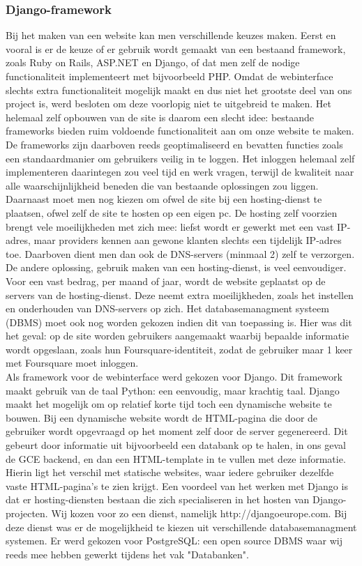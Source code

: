 \subsubsection{Django-framework}
Bij het maken van een website kan men verschillende keuzes maken.
Eerst en vooral is er de keuze of er gebruik wordt gemaakt van een bestaand framework, zoals Ruby on Rails, ASP.NET en Django, of dat men zelf de nodige functionaliteit implementeert met bijvoorbeeld PHP.
Omdat de webinterface slechts extra functionaliteit mogelijk maakt en dus niet het grootste deel van ons project is, werd besloten om deze voorlopig niet te uitgebreid te maken.
Het helemaal zelf opbouwen van de site is daarom een slecht idee: bestaande frameworks bieden ruim voldoende functionaliteit aan om onze website te maken. De frameworks zijn daarboven reeds geoptimaliseerd en bevatten functies zoals een standaardmanier om gebruikers veilig in te loggen. Het inloggen helemaal zelf implementeren daarintegen zou veel tijd en werk vragen, terwijl de kwaliteit naar alle waarschijnlijkheid beneden die van bestaande oplossingen zou liggen. 
Daarnaast moet men nog kiezen om ofwel de site bij een hosting-dienst te plaatsen, ofwel zelf de site te hosten op een eigen pc. De hosting zelf voorzien brengt vele moeilijkheden met zich mee: liefst wordt er gewerkt met een vast IP-adres, maar providers kennen aan gewone klanten slechts een tijdelijk IP-adres toe. Daarboven dient men dan ook de DNS-servers (minmaal 2) zelf te verzorgen.
De andere oplossing, gebruik maken van een hosting-dienst, is veel eenvoudiger. Voor een vast bedrag, per maand of jaar, wordt de website geplaatst op de servers van de hosting-dienst. Deze neemt extra moeilijkheden, zoals het instellen en onderhouden van DNS-servers op zich.
Het databasemanagment systeem (DBMS) moet ook nog worden gekozen indien dit van toepassing is. Hier was dit het geval: op de site worden gebruikers aangemaakt waarbij bepaalde informatie wordt opgeslaan, zoals hun Foursquare-identiteit, zodat de gebruiker maar 1 keer met Foursquare moet inloggen. \\
Als framework voor de webinterface werd gekozen voor Django. Dit framework maakt gebruik van de taal Python: een eenvoudig, maar krachtig taal. Django maakt het mogelijk om op relatief korte tijd toch een dynamische website te bouwen. Bij een dynamische website wordt de HTML-pagina die door de gebruiker wordt opgevraagd op het moment zelf door de server gegenereerd. Dit gebeurt door informatie uit bijvoorbeeld een databank op te halen, in ons geval de GCE backend, en dan een HTML-template in te vullen met deze informatie. Hierin ligt het verschil met statische websites, waar iedere gebruiker dezelfde vaste HTML-pagina's te zien krijgt.
Een voordeel van het werken met Django is dat er hosting-diensten bestaan die zich specialiseren in het hosten van Django-projecten. Wij kozen voor zo een dienst, namelijk http://djangoeurope.com.
Bij deze dienst was er de mogelijkheid te kiezen uit verschillende databasemanagment systemen. Er werd gekozen voor PostgreSQL: een open source DBMS waar wij reeds mee hebben gewerkt tijdens het vak "Databanken".

